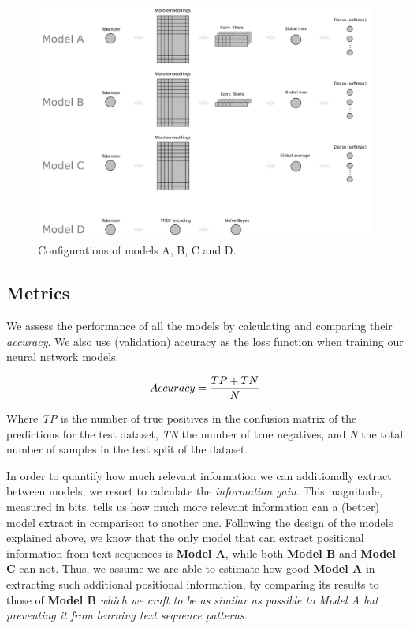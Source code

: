 \documentclass[10pt,journal,compsoc, onecolumn]{IEEEtran}
\begin{document}
\begin{figure}[h]
    \includegraphics[width=\linewidth]{images/models01.pdf}
    \caption{Configurations of models A, B, C and D.}
    \label{fig:models}
\end{figure}

\subsection{Metrics}

We assess the performance of all the models by calculating and comparing their \textit{accuracy}. We also use (validation) accuracy as the loss function when training our neural network models.

\begin{equation} 
\label{eq:accuracy}
    Accuracy = {TP + TN \over N}
\end{equation}

Where \textit{TP} is the number of true positives in the confusion matrix of the predictions for the test dataset, \textit{TN} the number of true negatives, and \textit{N} the total number of samples in the test split of the dataset.

In order to quantify how much relevant information we can additionally extract between models, we resort to calculate the \textit{information gain}. This magnitude, measured in bits, tells us how much more relevant information can a (better) model extract in comparison to another one. Following the design of the models explained above, we know that the only model that can extract positional information from text sequences is \textbf{Model A}, while both \textbf{Model B} and \textbf{Model C} can not. Thus, we assume we are able to estimate how good \textbf{Model A} in extracting such additional positional information, by comparing its results to those of \textbf{Model B} \textit{which we craft to be as similar as possible to Model A but preventing it from learning text sequence patterns}.
\end{document}
